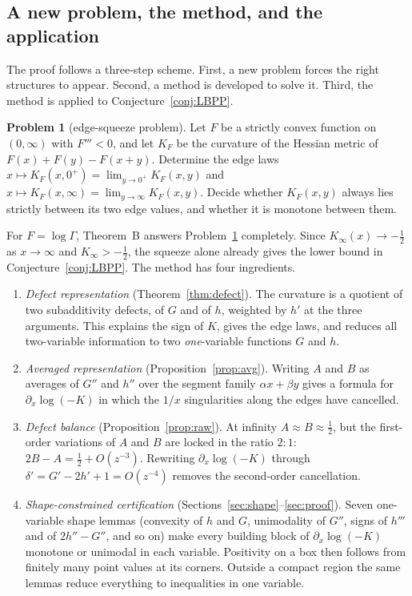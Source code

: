 \documentclass[11pt,a4paper]{article}
\theoremstyle{definition}
\newtheorem{problem}[theorem]{Problem}
\theoremstyle{remark}
\begin{document}
\subsection{A new problem, the method, and the application}
The proof follows a three-step scheme. First, a new problem forces the right structures to appear. Second, a method is developed to solve it. Third, the method is applied to Conjecture~\ref{conj:LBPP}.

\begin{problem}[edge-squeeze problem]\label{prob:edge}
Let $F$ be a strictly convex function on $(0,\infty)$ with $F'''<0$, and let $K_F$ be the curvature of the Hessian metric of $F(x)+F(y)-F(x+y)$. Determine the edge laws $x\mapsto K_F(x,0^+)=\lim_{y\to0^+}K_F(x,y)$ and $x\mapsto K_F(x,\infty)=\lim_{y\to\infty}K_F(x,y)$. Decide whether $K_F(x,y)$ always lies strictly between its two edge values, and whether it is monotone between them.
\end{problem}

For $F=\log\Gamma$, Theorem~B answers Problem~\ref{prob:edge} completely. Since $K_\infty(x)\to-\frac12$ as $x\to\infty$ and $K_\infty>-\frac12$, the squeeze alone already gives the lower bound in Conjecture~\ref{conj:LBPP}. The method has four ingredients.

\begin{enumerate}[label=(\roman*)]
\item \emph{Defect representation} (Theorem~\ref{thm:defect}). The curvature is a quotient of two subadditivity defects, of $G$ and of $h$, weighted by $h'$ at the three arguments. This explains the sign of $K$, gives the edge laws, and reduces all two-variable information to two \emph{one}-variable functions $G$ and $h$.
\item \emph{Averaged representation} (Proposition~\ref{prop:avg}). Writing $A$ and $B$ as averages of $G''$ and $h''$ over the segment family $\alpha x+\beta y$ gives a formula for $\partial_x\log(-K)$ in which the $1/x$ singularities along the edges have cancelled.
\item \emph{Defect balance} (Proposition~\ref{prop:raw}). At infinity $A\approx B\approx\frac12$, but the first-order variations of $A$ and $B$ are locked in the ratio $2:1$: $2B-A=\frac12+O(z^{-3})$. Rewriting $\partial_x\log(-K)$ through $\delta'=G'-2h'+1=O(z^{-4})$ removes the second-order cancellation.
\item \emph{Shape-constrained certification} (Sections~\ref{sec:shape}--\ref{sec:proof}). Seven one-variable shape lemmas (convexity of $h$ and $G$, unimodality of $G''$, signs of $h'''$ and of $2h''-G''$, and so on) make every building block of $\partial_x\log(-K)$ monotone or unimodal in each variable. Positivity on a box then follows from finitely many point values at its corners. Outside a compact region the same lemmas reduce everything to inequalities in one variable.
\end{enumerate}
\end{document}
